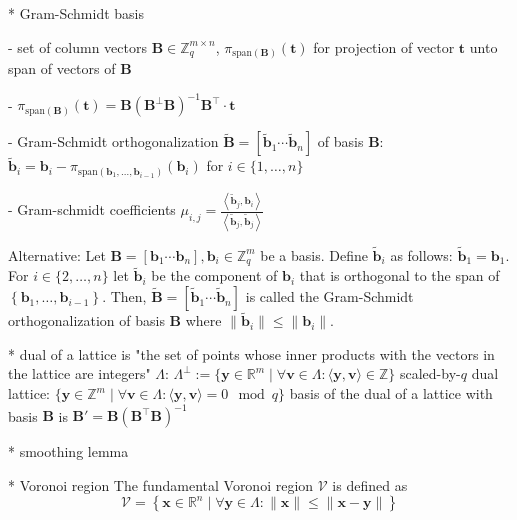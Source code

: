 \documentclass[
  a4paper,  %
  twoside,  %
  bibliography=totoc,
  headsepline,
  cleardoublepage=empty,
  parskip=half,
  draft=false
]{scrbook}
\begin{document}
* Gram-Schmidt basis \label{sec:gram-schmidt}%

- set of column vectors $\mathbf{B} \in \mathbb{Z}_q^{m\times n}$, $\pi_{\text{span}(\mathbf{B})}(\mathbf{t})$ for projection of vector $\mathbf{t}$ unto span of vectors of $\mathbf{B}$

- $\pi_{\text{span}(\mathbf{B})}(\mathbf{t}) = \mathbf{B}(\mathbf{B}^\perp \mathbf{B})^{-1}\mathbf{B}^\intercal \cdot \mathbf{t}$

- Gram-Schmidt orthogonalization $\tilde{\mathbf{B}} = \left[\tilde{\mathbf{b}}_1 \cdots \tilde{\mathbf{b}}_n\right]$ of basis $\mathbf{B}$: $\tilde{\mathbf{b}}_i = \mathbf{b}_i - \pi_{\text{span}(\mathbf{b}_1, \ldots, \mathbf{b}_{i-1})}(\mathbf{b}_i)$ for $i \in \{1, \ldots, n\}$

- Gram-schmidt coefficients $\mu_{i, j} = \frac{\left\langle \tilde{\mathbf{b}}_j, \mathbf{b}_i\right\rangle}{\left\langle \tilde{\mathbf{b}}_j, \tilde{\mathbf{b}}_j\right\rangle}$ %

Alternative:
Let $\mathbf{B} = \left[\mathbf{b}_1 \cdots \mathbf{b}_n\right], \mathbf{b}_i \in \mathbb{Z}_q^{m}$ be a basis. Define $\tilde{\mathbf{b}}_i$ as follows: $\tilde{\mathbf{b}}_1 = \mathbf{b}_1$. For $i \in \{2, \ldots, n\}$ let $\tilde{\mathbf{b}}_i$ be the component of $\mathbf{b}_i$ that is orthogonal to the span of $\left\{\mathbf{b}_1, \ldots, \mathbf{b}_{i-1}\right\}$. Then,  $\tilde{\mathbf{B}} = \left[\tilde{\mathbf{b}}_1 \cdots \tilde{\mathbf{b}}_n\right]$ is called the Gram-Schmidt orthogonalization of basis $\mathbf{B}$ where $\| \tilde{\mathbf{b}}_i\| \leq \| \mathbf{b}_i\|$.


* dual of a lattice is "the set of points whose inner products with the vectors in the lattice are integers" $\Lambda$: $\Lambda^{\perp} := \{ \mathbf{y} \in \mathbb{R}^m \mid \forall \mathbf{v} \in \Lambda: \langle \mathbf{y}, \mathbf{v} \rangle \in \mathbb{Z}\}$
scaled-by-$q$ dual lattice:  $\{ \mathbf{y} \in \mathbb{Z}^m \mid \forall \mathbf{v} \in \Lambda: \langle \mathbf{y}, \mathbf{v} \rangle = 0 \mod q\}$ %
basis of the dual of a lattice with basis $\mathbf{B}$ is $\mathbf{B'} = \mathbf{B} (\mathbf{B}^\intercal \mathbf{B})^{-1}$ %

* smoothing lemma

* Voronoi region %
The fundamental Voronoi region $\mathcal{V}$ is defined as
\begin{equation}
  \mathcal{V} = \left\{ \mathbf{x} \in \mathbb{R}^n \mid \forall \mathbf{y} \in \Lambda : \| \mathbf{x} \| \leq \| \mathbf{x} - \mathbf{y} \| \right\}
\end{equation}
\end{document}
